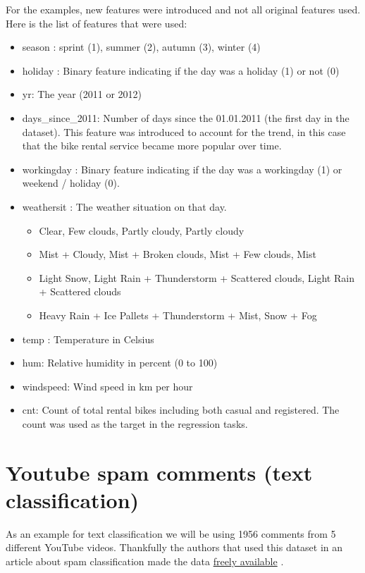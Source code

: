 \documentclass[12pt,]{krantz}
\providecommand{\tightlist}{%
  \setlength{\itemsep}{0pt}\setlength{\parskip}{0pt}}
\theoremstyle{definition}
\theoremstyle{definition}
\theoremstyle{definition}
\theoremstyle{remark}
\begin{document}
For the examples, new features were introduced and not all original
features used. Here is the list of features that were used:

\begin{itemize}
\tightlist
\item
  season : sprint (1), summer (2), autumn (3), winter (4)
\item
  holiday : Binary feature indicating if the day was a holiday (1) or
  not (0)
\item
  yr: The year (2011 or 2012)
\item
  days\_since\_2011: Number of days since the 01.01.2011 (the first day
  in the dataset). This feature was introduced to account for the trend,
  in this case that the bike rental service became more popular over
  time.
\item
  workingday : Binary feature indicating if the day was a workingday (1)
  or weekend / holiday (0).
\item
  weathersit : The weather situation on that day.

  \begin{itemize}
  \tightlist
  \item
    Clear, Few clouds, Partly cloudy, Partly cloudy
  \item
    Mist + Cloudy, Mist + Broken clouds, Mist + Few clouds, Mist
  \item
    Light Snow, Light Rain + Thunderstorm + Scattered clouds, Light Rain
    + Scattered clouds
  \item
    Heavy Rain + Ice Pallets + Thunderstorm + Mist, Snow + Fog
  \end{itemize}
\item
  temp : Temperature in Celsius
\item
  hum: Relative humidity in percent (0 to 100)
\item
  windspeed: Wind speed in km per hour
\item
  cnt: Count of total rental bikes including both casual and registered.
  The count was used as the target in the regression tasks.
\end{itemize}

\section{Youtube spam comments (text classification)}\label{spam-data}

As an example for text classification we will be using 1956 comments
from 5 different YouTube videos. Thankfully the authors that used this
dataset in an article about spam classification made the data
\href{http://dcomp.sor.ufscar.br/talmeida/youtubespamcollection/}{freely
available} \citep{alberto2015tubespam}.
\end{document}
